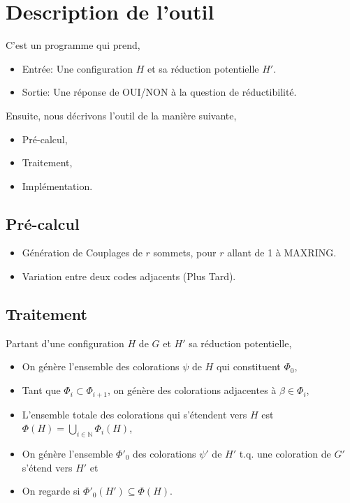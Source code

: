 \documentclass{beamer}
\begin{document}
\section{Description de l'outil}

\begin{frame}
C'est un programme qui prend,
\begin{itemize}
\item Entrée:  Une configuration $H$ et sa réduction potentielle $H'$.
\item Sortie:  Une réponse de OUI/NON à la question de réductibilité.
\end{itemize}
Ensuite, nous décrivons l'outil de la manière suivante,
\begin{itemize}
\item Pré-calcul,
\item Traitement,
\item Implémentation.
\end{itemize} 
\end{frame}

\subsection{Pré-calcul}
\begin{frame}
\begin{itemize}
\item Génération de Couplages de $r$ sommets, pour $r$ allant de 1 à MAXRING.
\item Variation entre deux codes adjacents (Plus Tard).
\end{itemize}
\end{frame}

\subsection{Traitement}

\begin{frame}
Partant d'une configuration $H$ de $G$ et $H'$ sa réduction potentielle,
\begin{itemize}
\item On génère l'ensemble des colorations $\psi$ de $H$ qui constituent $\Phi_0$,
\item Tant que $\Phi_i \subset \Phi_{i+1}$, on génère des colorations adjacentes à $\beta \in \Phi_i$,
\item L'ensemble totale des colorations qui s'étendent vers $H$ est $\Phi(H) = \bigcup_{i \in \mathbb{N}} \Phi_i(H)$,
\item On génère l'ensemble $\Phi'_0$ des colorations $\psi'$ de $H'$ t.q. une coloration de $G'$ s'étend vers $H'$ et
\item On regarde si $\Phi'_0(H') \subseteq \Phi(H)$.
\end{itemize}
\end{frame}
\end{document}
